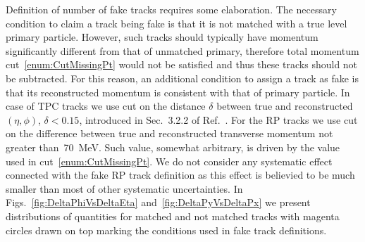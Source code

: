 Definition of number of fake tracks requires some elaboration. The necessary condition to claim a track being fake is that it is not matched with a true level primary particle. However, such tracks should typically have momentum significantly different from that of unmatched primary, therefore total momentum cut~\ref{enum:CutMissingPt} would not be satisfied and thus these tracks should not be subtracted. For this reason, an additional condition to assign a track as fake is that its reconstructed momentum is consistent with that of primary particle. In case of TPC tracks we use cut on the distance $\delta$ between true and reconstructed $(\eta,\phi)$, $\delta < 0.15$, introduced in Sec.~3.2.2 of Ref.~\cite{supplementaryNote}. For the RP tracks we use cut on the difference between true and reconstructed transverse momentum not greater than~70~MeV. Such value, somewhat arbitrary, is driven by the value used in cut~\ref{enum:CutMissingPt}. We do not consider any systematic effect connected with the fake RP track definition as this effect is believied to be much smaller than most of other systematic uncertainties. In Figs.~\ref{fig:DeltaPhiVsDeltaEta} and~\ref{fig:DeltaPyVsDeltaPx} we present distributions of quantities for matched and not matched tracks with magenta circles drawn on top marking the conditions used in fake track definitions.


